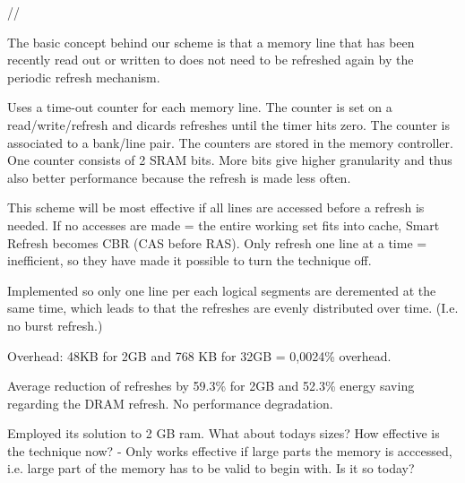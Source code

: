 //


The basic concept behind our scheme is that a memory line that has been recently read out or written to does not need to be refreshed again by the periodic refresh mechanism.

Uses a time-out counter for each memory line. The counter is set on a read/write/refresh and dicards refreshes until the timer hits zero. The counter is associated to a bank/line pair. The counters are stored in the memory controller. One counter consists of 2 SRAM bits. More bits give higher granularity and thus also better performance because the refresh is made less often.

This scheme will be most effective if all lines are accessed before a refresh is needed. If no accesses are made = the entire working set fits into cache, Smart Refresh becomes CBR (CAS before RAS). Only refresh one line at a time = inefficient, so they have made it possible to turn the technique off.

Implemented so only one line per each logical segments are deremented at the same time, which leads to that the refreshes are evenly distributed over time. (I.e. no burst refresh.)

Overhead: 48KB for 2GB and 768 KB for 32GB = 0,0024\% overhead. 

Average reduction of refreshes by 59.3\% for 2GB and 52.3\% energy saving regarding the DRAM refresh. No performance degradation.

Employed its solution to 2 GB ram. What about todays sizes? How effective is the technique now? - Only works effective if large parts the memory is acccessed, i.e. large part of the memory has to be valid to begin with. Is it so today?